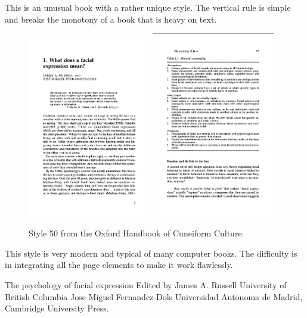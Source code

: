 This is an unusual book with a rather unique style. The vertical rule is simple and breaks the monotony of a book that is heavy on text.
\begin{figure}[ht]
\includegraphics[width=0.48\textwidth]{./chapters/chapter50.png}\hfill
\includegraphics[width=0.48\textwidth]{./chapters/chapter50a.png}
\caption{Style 50 from the Oxford Handbook of Cuneiform Culture.}
\end{figure}

This style is very modern and typical of many computer books. The difficulty is in integrating all the page elements to make it work flawlessly.

The psychology of facial
expression
Edited by
James A. Russell
University of British Columbia
Jose Miguel Fernandez-Dols
Universidad Autonoma de Madrid, Cambridge University Press.

